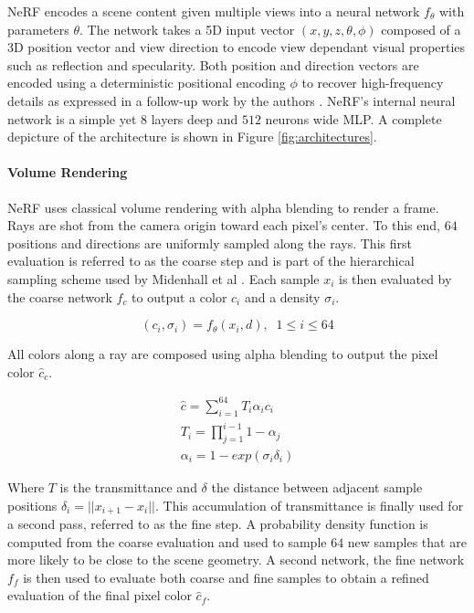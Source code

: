 \gls{NeRF} encodes a scene content given multiple views into a neural network $f_{\theta}$ with parameters $\theta$. The network takes a 5D input vector $(x,y,z,\theta,\phi)$ composed of a 3D position vector and view direction to encode view dependant visual properties such as reflection and specularity. Both position and direction vectors are encoded using a deterministic positional encoding $\phi$ to recover high-frequency details as expressed in a follow-up work by the authors . \gls{NeRF}'s internal neural network is a simple yet $8$ layers deep and $512$ neurons wide \gls{MLP}. A complete depicture of the architecture is shown in Figure \ref{fig:architectures}.

\paragraph{Volume Rendering}

\gls{NeRF} uses classical volume rendering with alpha blending to render a frame. Rays are shot from the camera origin toward each pixel's center. To this end, $64$ positions and directions are uniformly sampled along the rays. This first evaluation is referred to as the coarse step and is part of the hierarchical sampling scheme used by Midenhall et al \cite{Mildenhall2020}. Each sample $x_i$ is then evaluated by the coarse network $f_c$ to output a color $c_i$ and a density $\sigma_i$.

\begin{equation}
    (c_i, \sigma_i) = f_{\theta}(x_i, d), \;\; 1 \leq i \leq 64
\end{equation}

All colors along a ray are composed using alpha blending to output the pixel color $\hat{c}_c$.

\begin{gather}
    \hat{c} = \sum_{i=1}^{64} T_i \alpha_i c_i \label{2} \\
    T_i = \prod_{j=1}^{i-1} 1 - \alpha_j       \label{3} \\
    \alpha_i = 1 - exp(\sigma_i \delta_i)      \label{4}
\end{gather}

Where $T$ is the transmittance and $\delta$ the distance between adjacent sample positions $\delta_i = || x_{i+1} - x_i ||$. This accumulation of transmittance is finally used for a second pass, referred to as the fine step. A probability density function is computed from the coarse evaluation and used to sample $64$ new samples that are more likely to be close to the scene geometry. A second network, the fine network $f_f$ is then used to evaluate both coarse and fine samples to obtain a refined evaluation of the final pixel color $\hat{c}_f$.

